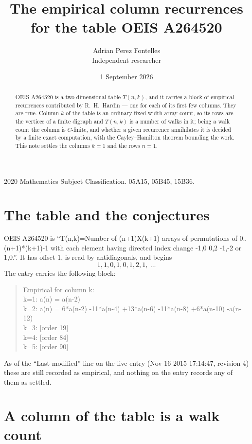 \documentclass[11pt,a4paper]{article}
\title{The empirical column recurrences for the table OEIS A264520}
\author{Adrian Perez Fontelles\\ \small Independent researcher}
\date{1 September 2026}
\theoremstyle{plain}
\theoremstyle{definition}
\begin{document}
\maketitle

\begin{abstract}
OEIS A264520 is a two-dimensional table $T(n,k)$, and it carries a block of empirical
recurrences contributed by R.~H.~Hardin --- one for each of its first few columns. They are
true. Column $k$ of the table is an ordinary fixed-width array count, so its rows are the
vertices of a finite digraph and $T(n,k)$ is a number of walks in it; being a walk count the
column is $C$-finite, and whether a given recurrence annihilates it is decided by a finite
exact computation, with the Cayley--Hamilton theorem bounding the work. This note settles the columns $k=1$ and the rows $n=1$.
\end{abstract}

\noindent\small 2020 Mathematics Subject Classification. 05A15, 05B45, 15B36.\normalsize

\section{The table and the conjectures}

OEIS A264520 is ``T(n,k)=Number of (n+1)X(k+1) arrays of permutations of 0..(n+1)*(k+1)-1 with each element having directed index change -1,0 0,2 -1,-2 or 1,0.''. It has offset $1$, is
read by antidiagonals, and begins
\[
1, 1, 0, 1, 0, 1, 2, 1,\ \dots
\]
The entry carries the following block:
\begin{quote}\small
Empirical for column k:\\
k=1: a(n) = a(n-2)\\
k=2: a(n) = 6*a(n-2) -11*a(n-4) +13*a(n-6) -11*a(n-8) +6*a(n-10) -a(n-12)\\
k=3: [order 19]\\
k=4: [order 84]\\
k=5: [order 90]\\
\end{quote}
As of the ``Last modified'' line on the live entry (Nov 16 2015 17:14:47, revision 4) these are still
recorded as empirical, and nothing on the entry records any of them as settled.

\section{A column of the table is a walk count}
\end{document}
